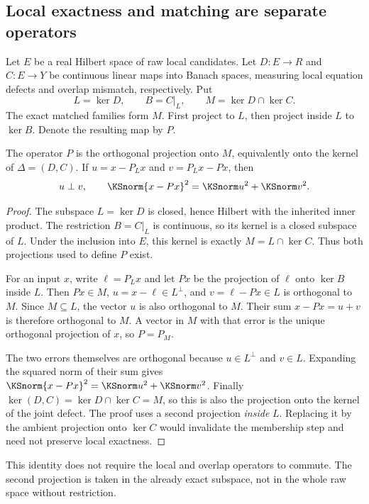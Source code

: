 \label{KS:sec:quantitative}
\subsection{Local exactness and matching are separate operators}
Let \(E\) be a real Hilbert space of raw local candidates. Let \(D:E\to R\) and \(C:E\to Y\) be continuous linear maps into Banach spaces, measuring local equation defects and overlap mismatch, respectively. Put
\[
 L=\ker D,\qquad B=C|_L,
 \qquad M=\ker D\cap\ker C.
\]
The exact matched families form \(M\). First project to \(L\), then project inside \(L\) to \(\ker B\). Denote the resulting map by \(P\).

\begin{KStheorem}\label{KS:KS46}
The operator \(P\) is the orthogonal projection onto \(M\), equivalently onto the kernel of \(\Delta=(D,C)\). If \(u=x-P_Lx\) and \(v=P_Lx-Px\), then
\[
 u\perp v,\qquad\KSnorm{x-Px}^2=\KSnorm u^2+\KSnorm v^2.
\]
\end{KStheorem}
\begin{proof}
The subspace \(L=\ker D\) is closed, hence Hilbert with the inherited inner product. The restriction \(B=C|_L\) is continuous, so its kernel is a closed subspace of \(L\). Under the inclusion into \(E\), this kernel is exactly \(M=L\cap\ker C\). Thus both projections used to define \(P\) exist.

For an input \(x\), write \(\ell=P_Lx\) and let \(Px\) be the projection of \(\ell\) onto \(\ker B\) inside \(L\). Then \(Px\in M\), \(u=x-\ell\in L^\perp\), and \(v=\ell-Px\in L\) is orthogonal to \(M\). Since \(M\subseteq L\), the vector \(u\) is also orthogonal to \(M\). Their sum \(x-Px=u+v\) is therefore orthogonal to \(M\). A vector in \(M\) with that error is the unique orthogonal projection of \(x\), so \(P=P_M\).

The two errors themselves are orthogonal because \(u\in L^\perp\) and \(v\in L\). Expanding the squared norm of their sum gives \(\KSnorm{x-Px}^2=\KSnorm u^2+\KSnorm v^2\). Finally \(\ker(D,C)=\ker D\cap\ker C=M\), so this is also the projection onto the kernel of the joint defect. The proof uses a second projection \emph{inside} \(L\). Replacing it by the ambient projection onto \(\ker C\) would invalidate the membership step and need not preserve local exactness.
\end{proof}
This identity does not require the local and overlap operators to commute. The second projection is taken in the already exact subspace, not in the whole raw space without restriction.

